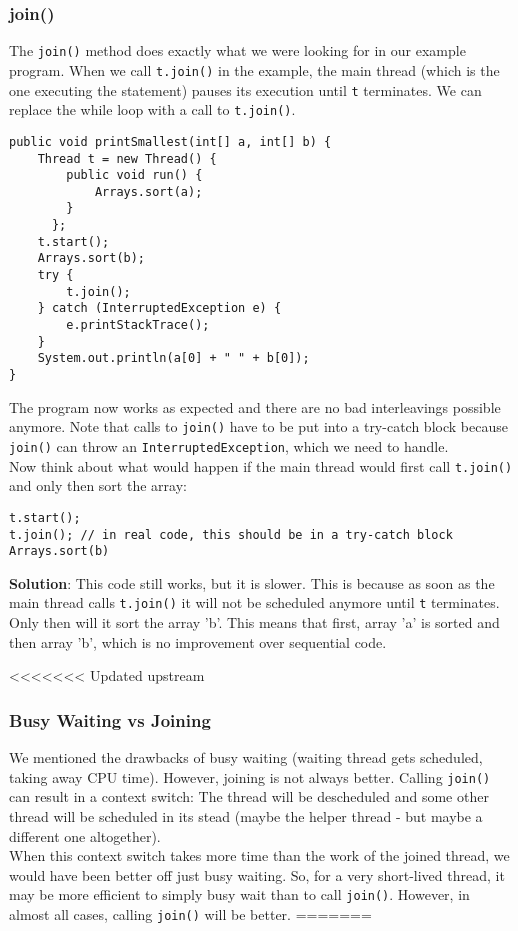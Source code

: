 \documentclass[main.tex]{subfiles}
\begin{document}
\subsubsection{join()}
The \texttt{join()} method does exactly what we were looking for in our example program. When we call \texttt{t.join()} in the example, the main thread (which is the one executing the statement) pauses its execution until \texttt{t} terminates. We can replace the while loop with a call to \texttt{t.join()}.
\begin{verbatim}
public void printSmallest(int[] a, int[] b) {
    Thread t = new Thread() {
        public void run() {
            Arrays.sort(a);
        }
      };
    t.start();
    Arrays.sort(b);
    try {
        t.join();
    } catch (InterruptedException e) {
        e.printStackTrace();
    }
    System.out.println(a[0] + " " + b[0]);
}
\end{verbatim}
The program now works as expected and there are no bad interleavings possible anymore. Note that calls to \texttt{join()} have to be put into a try-catch block because \texttt{join()} can throw an \texttt{InterruptedException}, which we need to handle.\\[3mm]
Now think about what would happen if the main thread would first call \texttt{t.join()} and only then sort the array:
\begin{verbatim}
t.start();
t.join(); // in real code, this should be in a try-catch block
Arrays.sort(b)
\end{verbatim}
\textbf{Solution}: This code still works, but it is slower. This is because as soon as the main thread calls \texttt{t.join()} it will not be scheduled anymore until \texttt{t} terminates. Only then will it sort the array 'b'. This means that first, array 'a' is sorted and then array 'b', which is no improvement over sequential code.

<<<<<<< Updated upstream
\subsubsection{Busy Waiting vs Joining}
We mentioned the drawbacks of busy waiting (waiting thread gets scheduled, taking away CPU time). However, joining is not always better. Calling \texttt{join()} can result in a context switch: The thread will be descheduled and some other thread will be scheduled in its stead (maybe the helper thread - but maybe a different one altogether).\\
When this context switch takes more time than the work of the joined thread, we would have been better off just busy waiting. So, for a very short-lived thread, it may be more efficient to simply busy wait than to call \texttt{join()}. However, in almost all cases, calling \texttt{join()} will be better.
=======
\end{document}
